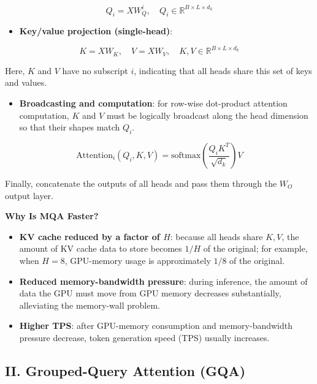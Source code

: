 \[
Q_i = XW_Q^i, \quad Q_i \in \mathbb{R}^{B \times L \times d_k}
\]

\begin{itemize}
\tightlist
\item
{}
  \textbf{Key/value projection (single-head)}:
\end{itemize}

\[
K = XW_K, \quad V = XW_V, \quad K,V \in \mathbb{R}^{B \times L \times d_k}
\]

Here, \(K\) and \(V\) have no subscript \(i\), indicating that all heads share this set of keys and values.

\begin{itemize}
\tightlist
\item
  \textbf{Broadcasting and computation}: for row-wise dot-product attention computation, \(K\) and \(V\) must be logically broadcast along the head dimension so that their shapes match \(Q_i\).
\end{itemize}

\[
\mathrm{Attention}_i(Q_i,K,V)=\mathrm{softmax}\left(\frac{Q_iK^T}{\sqrt{d_k}}\right)V
\]

Finally, concatenate the outputs of all heads and pass them through the \(W_O\) output layer.

\textbf{Why Is MQA Faster?}

\begin{itemize}
\tightlist
\item
  \textbf{KV cache reduced by a factor of \(H\)}: because all heads share \(K,V\), the amount of KV cache data to store becomes \(1/H\) of the original; for example, when \(H=8\), GPU-memory usage is approximately \(1/8\) of the original.
\item
  \textbf{Reduced memory-bandwidth pressure}: during inference, the amount of data the GPU must move from GPU memory decreases substantially, alleviating the memory-wall problem.
\item
  \textbf{Higher TPS}: after GPU-memory consumption and memory-bandwidth pressure decrease, token generation speed (TPS) usually increases.
\end{itemize}

\hypertarget{ii.-grouped-query-attention-gqa}{%
\subsection{II. Grouped-Query Attention (GQA)}\label{ii.-grouped-query-attention-gqa}}

